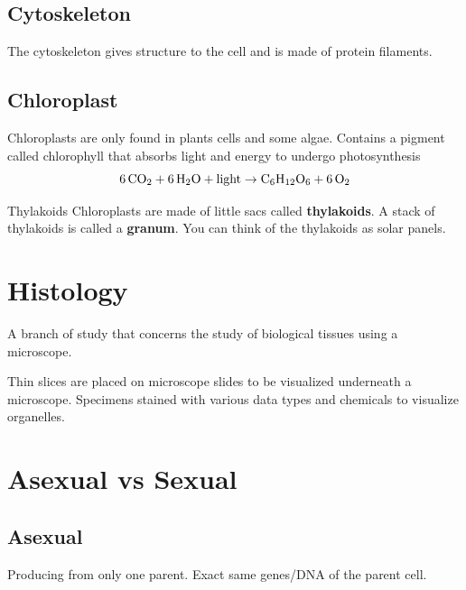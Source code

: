 \documentclass[12pt]{report}
\begin{document}
\subsection{Cytoskeleton}
\begin{definition}[Cytoskeleton]
    The cytoskeleton gives structure to the cell and is made of protein filaments.
\end{definition}

\subsection{Chloroplast}
\begin{definition}[Chloroplast]
    Chloroplasts are only found in plants cells and some algae. Contains a pigment called chlorophyll that absorbs light and energy to undergo photosynthesis 
    \[
        \ce{6CO2}+ \ce{6H2O}+ \text{light}\to \ce{C6H12O6}+ \ce{6O2}
    \]
\end{definition}

\begin{note}{Thylakoids}
Chloroplasts are made of little sacs called \textbf{thylakoids}. A stack of thylakoids is called a \textbf{granum}. You can think of the thylakoids as solar panels.
\end{note}

\section{Histology}
\begin{definition}[Histology]
    A branch of study that concerns the study of biological tissues using a microscope.
\end{definition}

Thin slices are placed on microscope slides to be visualized underneath a microscope. Specimens stained with various data types and chemicals to visualize organelles. 

\section{Asexual vs Sexual}
\subsection{Asexual}
\begin{definition}[Asexual]
    Producing from only one parent. Exact same genes/DNA of the parent cell.
\end{definition}
\end{document}
